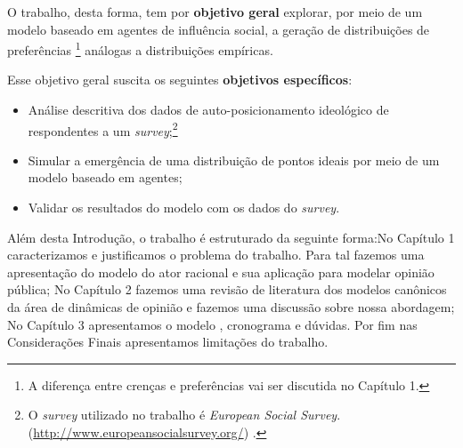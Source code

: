 O trabalho, desta forma, tem por \textbf{objetivo geral} explorar, por meio
de um modelo baseado em agentes de influência social, a geração de distribuições
de preferências \footnote{A diferença entre crenças e preferências vai ser
discutida no Capítulo 1.} análogas a distribuições empíricas.

Esse objetivo geral suscita os seguintes \textbf{objetivos específicos}:

\begin{itemize}
\item Análise descritiva dos dados de auto-posicionamento ideológico de
  respondentes a um \textit{survey};\footnote{ O \textit{survey} utilizado no
    trabalho é \textit{European Social Survey}.
    (\url{http://www.europeansocialsurvey.org/}) .}
\item Simular a emergência de uma distribuição de pontos ideais por meio de um
  modelo baseado em agentes; 
\item Validar os resultados do modelo com os dados do \textit{survey}.
\end{itemize}

Além desta Introdução, o trabalho é estruturado da seguinte forma:No Capítulo 1
caracterizamos e justificamos o problema do trabalho. Para tal fazemos uma
apresentação do modelo do ator racional e sua aplicação para modelar opinião
pública; No Capítulo 2 fazemos uma revisão de literatura dos modelos canônicos
da área de dinâmicas de opinião e fazemos uma discussão sobre nossa abordagem;
No Capítulo 3 apresentamos o modelo , cronograma e dúvidas. Por fim nas
Considerações Finais apresentamos limitações do trabalho.








